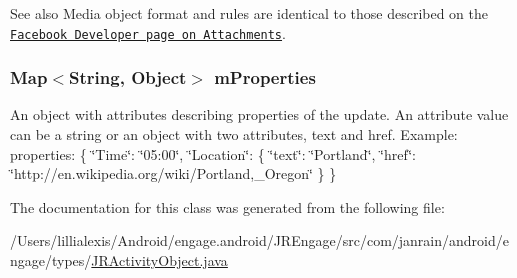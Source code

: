 \begin{DoxySeeAlso}{See also}
Media object format and rules are identical to those described on the \href{http://developers.facebook.com/docs/guides/attachments}{\tt Facebook Developer page on Attachments}. 
\end{DoxySeeAlso}
\hypertarget{classcom_1_1janrain_1_1android_1_1engage_1_1types_1_1_j_r_activity_object_afd9064d65c67347bee51e205abccbb00}{
\subsubsection[{mProperties}]{\setlength{\rightskip}{0pt plus 5cm}Map$<$String, Object$>$ {\bf mProperties}}}
\label{classcom_1_1janrain_1_1android_1_1engage_1_1types_1_1_j_r_activity_object_afd9064d65c67347bee51e205abccbb00}
An object with attributes describing properties of the update. An attribute value can be a string or an object with two attributes, text and href. Example: {\ttfamily  properties: \{ \char`\"{}Time\char`\"{}: \char`\"{}05:00\char`\"{}, \char`\"{}Location\char`\"{}: \{ \char`\"{}text\char`\"{}: \char`\"{}Portland\char`\"{}, \char`\"{}href\char`\"{}: \char`\"{}http://en.wikipedia.org/wiki/Portland,\_\-Oregon\char`\"{} \} \} } 

The documentation for this class was generated from the following file:\begin{DoxyCompactItemize}
\item 
/Users/lillialexis/Android/engage.android/JREngage/src/com/janrain/android/engage/types/\hyperlink{_j_r_activity_object_8java}{JRActivityObject.java}\end{DoxyCompactItemize}
